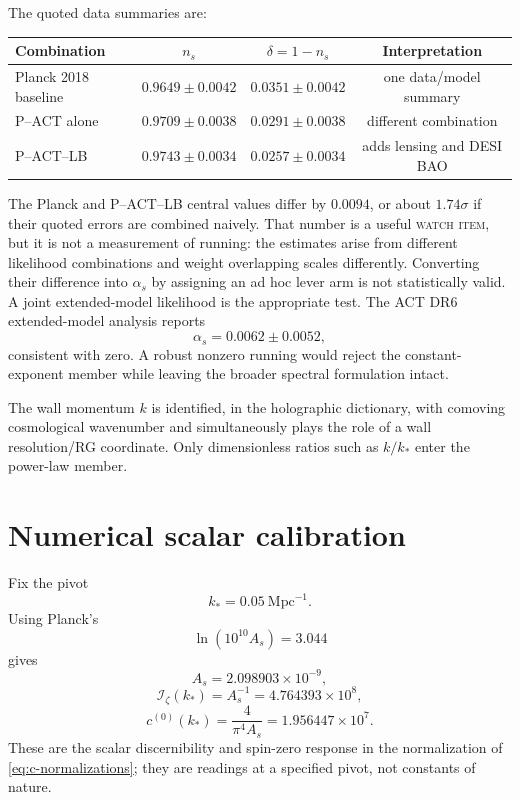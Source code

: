 \documentclass[11pt]{article}
\numberwithin{equation}{section}
\newcommand{\Iz}{\mathcal I_\zeta}
\newcommand{\cz}{c^{(0)}}
\newcommand{\status}[1]{\textsc{\footnotesize #1}}
\theoremstyle{definition}
\theoremstyle{remark}
\begin{document}
The quoted data summaries are:
\begin{center}
\begin{tabular}{@{}lccc@{}}
\toprule
\textbf{Combination} & $n_s$ & $\delta=1-n_s$ & \textbf{Interpretation}\\
\midrule
Planck 2018 baseline & $0.9649\pm0.0042$ & $0.0351\pm0.0042$ & one data/model summary\\
P--ACT alone & $0.9709\pm0.0038$ & $0.0291\pm0.0038$ & different combination\\
P--ACT--LB & $0.9743\pm0.0034$ & $0.0257\pm0.0034$ & adds lensing and DESI BAO\\
\bottomrule
\end{tabular}
\end{center}
The Planck and P--ACT--LB central values differ by $0.0094$, or about $1.74\sigma$ if their quoted errors are combined naively. That number is a useful \status{watch item}, but it is not a measurement of running: the estimates arise from different likelihood combinations and weight overlapping scales differently. Converting their difference into $\alpha_s$ by assigning an ad hoc lever arm is not statistically valid. A joint extended-model likelihood is the appropriate test. The ACT DR6 extended-model analysis reports
\begin{equation}
\alpha_s=0.0062\pm0.0052,
\end{equation}
consistent with zero. A robust nonzero running would reject the constant-exponent member while leaving the broader spectral formulation intact.

The wall momentum $k$ is identified, in the holographic dictionary, with comoving cosmological wavenumber and simultaneously plays the role of a wall resolution/RG coordinate. Only dimensionless ratios such as $k/k_*$ enter the power-law member.

\section{Numerical scalar calibration}
\label{sec:calibration}

Fix the pivot
\begin{equation}
k_*=0.05\ \mathrm{Mpc}^{-1}.
\end{equation}
Using Planck's
\begin{equation}
\ln(10^{10}A_s)=3.044
\end{equation}
gives
\begin{equation}
A_s=2.098903\times10^{-9},
\end{equation}
\begin{equation}
\boxed{\Iz(k_*)=A_s^{-1}=4.764393\times10^8,}
\end{equation}
\begin{equation}
\boxed{\cz(k_*)=\frac{4}{\pi^4A_s}=1.956447\times10^7.}
\end{equation}
These are the scalar discernibility and spin-zero response in the normalization of \cref{eq:c-normalizations}; they are readings at a specified pivot, not constants of nature.
\end{document}
